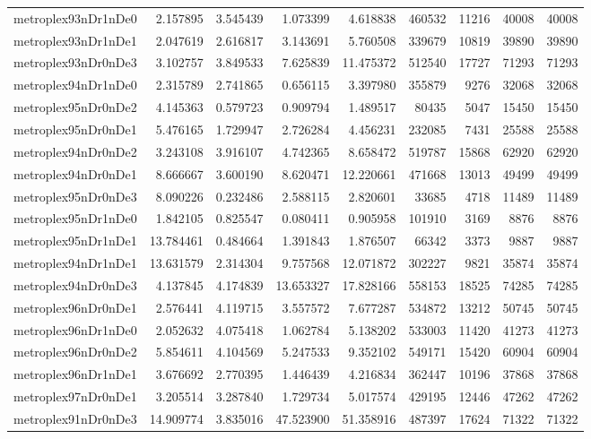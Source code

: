 \begin{longtable}{|l|r|r|r|r|r|r|r|r|}
metroplex93nDr1nDe0 & 2.157895 & 3.545439 & 1.073399 & 4.618838 & 460532 & 11216 & 40008 & 40008 \\
metroplex93nDr1nDe1 & 2.047619 & 2.616817 & 3.143691 & 5.760508 & 339679 & 10819 & 39890 & 39890 \\
metroplex93nDr0nDe3 & 3.102757 & 3.849533 & 7.625839 & 11.475372 & 512540 & 17727 & 71293 & 71293 \\
metroplex94nDr1nDe0 & 2.315789 & 2.741865 & 0.656115 & 3.397980 & 355879 & 9276 & 32068 & 32068 \\
metroplex95nDr0nDe2 & 4.145363 & 0.579723 & 0.909794 & 1.489517 & 80435 & 5047 & 15450 & 15450 \\
metroplex95nDr0nDe1 & 5.476165 & 1.729947 & 2.726284 & 4.456231 & 232085 & 7431 & 25588 & 25588 \\
metroplex94nDr0nDe2 & 3.243108 & 3.916107 & 4.742365 & 8.658472 & 519787 & 15868 & 62920 & 62920 \\
metroplex94nDr0nDe1 & 8.666667 & 3.600190 & 8.620471 & 12.220661 & 471668 & 13013 & 49499 & 49499 \\
metroplex95nDr0nDe3 & 8.090226 & 0.232486 & 2.588115 & 2.820601 & 33685 & 4718 & 11489 & 11489 \\
metroplex95nDr1nDe0 & 1.842105 & 0.825547 & 0.080411 & 0.905958 & 101910 & 3169 & 8876 & 8876 \\
metroplex95nDr1nDe1 & 13.784461 & 0.484664 & 1.391843 & 1.876507 & 66342 & 3373 & 9887 & 9887 \\
metroplex94nDr1nDe1 & 13.631579 & 2.314304 & 9.757568 & 12.071872 & 302227 & 9821 & 35874 & 35874 \\
metroplex94nDr0nDe3 & 4.137845 & 4.174839 & 13.653327 & 17.828166 & 558153 & 18525 & 74285 & 74285 \\
metroplex96nDr0nDe1 & 2.576441 & 4.119715 & 3.557572 & 7.677287 & 534872 & 13212 & 50745 & 50745 \\
metroplex96nDr1nDe0 & 2.052632 & 4.075418 & 1.062784 & 5.138202 & 533003 & 11420 & 41273 & 41273 \\
metroplex96nDr0nDe2 & 5.854611 & 4.104569 & 5.247533 & 9.352102 & 549171 & 15420 & 60904 & 60904 \\
metroplex96nDr1nDe1 & 3.676692 & 2.770395 & 1.446439 & 4.216834 & 362447 & 10196 & 37868 & 37868 \\
metroplex97nDr0nDe1 & 3.205514 & 3.287840 & 1.729734 & 5.017574 & 429195 & 12446 & 47262 & 47262 \\
metroplex91nDr0nDe3 & 14.909774 & 3.835016 & 47.523900 & 51.358916 & 487397 & 17624 & 71322 & 71322 \\

\end{longtable}
